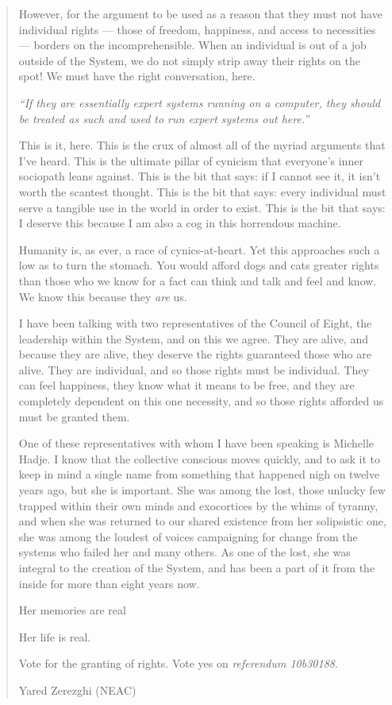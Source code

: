 \begin{quote}
However, for the argument to be used as a reason that they must not have individual rights — those of freedom, happiness, and access to necessities — borders on the incomprehensible. When an individual is out of a job outside of the System, we do not simply strip away their rights on the spot! We must have the right conversation, here.

\emph{``If they are essentially expert systems running on a computer, they should be treated as such and used to run expert systems out here.''}

This is it, here. This is the crux of almost all of the myriad arguments that I've heard. This is the ultimate pillar of cynicism that everyone's inner sociopath leans against. This is the bit that says: if I cannot see it, it isn't worth the scantest thought. This is the bit that says: every individual must serve a tangible use in the world in order to exist. This is the bit that says: I deserve this because I am also a cog in this horrendous machine.

Humanity is, as ever, a race of cynics-at-heart. Yet this approaches such a low as to turn the stomach. You would afford dogs and cats greater rights than those who we know for a fact can think and talk and feel and know. We know this because they \emph{are} us.

I have been talking with two representatives of the Council of Eight, the leadership within the System, and on this we agree. They are alive, and because they are alive, they deserve the rights guaranteed those who are alive. They are individual, and so those rights must be individual. They can feel happiness, they know what it means to be free, and they are completely dependent on this one necessity, and so those rights afforded us must be granted them.

One of these representatives with whom I have been speaking is Michelle Hadje. I know that the collective conscious moves quickly, and to ask it to keep in mind a single name from something that happened nigh on twelve years ago, but she is important. She was among the lost, those unlucky few trapped within their own minds and exocortices by the whims of tyranny, and when she was returned to our shared existence from her solipsistic one, she was among the loudest of voices campaigning for change from the systems who failed her and many others. As one of the lost, she was integral to the creation of the System, and has been a part of it from the inside for more than eight years now.

Her memories are real

Her life is real.

Vote for the granting of rights. Vote yes on \emph{referendum 10b30188}.

Yared Zerezghi (NEAC)
\end{quote}

